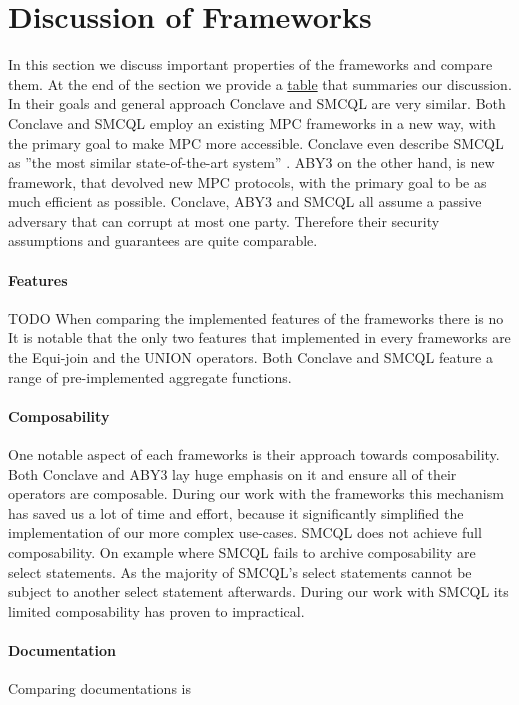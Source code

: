 \section{Discussion of Frameworks}
In this section we discuss important properties of the frameworks and compare them. 
At the end of the section we provide a \hyperref[Summary]{table} that summaries our discussion.
In their goals and general approach Conclave and SMCQL are very similar. Both Conclave and SMCQL employ an existing MPC frameworks in a new way, with the primary goal to make MPC more accessible. Conclave even describe SMCQL as ''the most similar state-of-the-art system'' \cite{10.1145/3302424.3303982}. ABY3 on the other hand, is new framework, that devolved new MPC protocols, with the primary goal to be as much efficient as possible. 
Conclave, ABY3 and SMCQL all assume a passive adversary that can corrupt at most one party. Therefore their security assumptions and guarantees are quite comparable. 
\paragraph{Features} TODO
When comparing the implemented features of the frameworks there is no 
It is notable that the only two features that implemented in every frameworks are the Equi-join and the UNION operators. 
Both Conclave and SMCQL feature a range of pre-implemented aggregate functions.  
\paragraph{Composability}
One notable aspect of each frameworks is their approach towards composability. Both Conclave and ABY3 lay huge emphasis on it and ensure all of their operators are composable. During our work with the frameworks this mechanism has saved us a lot of time and effort, because it significantly simplified the implementation of our more complex use-cases.
SMCQL does not achieve full composability. On example where SMCQL fails to archive composability are select statements. As the majority of SMCQL's select statements cannot be subject to another select statement afterwards. During our work with SMCQL its limited composability has proven to impractical. 
\paragraph{Documentation}
Comparing documentations is 

